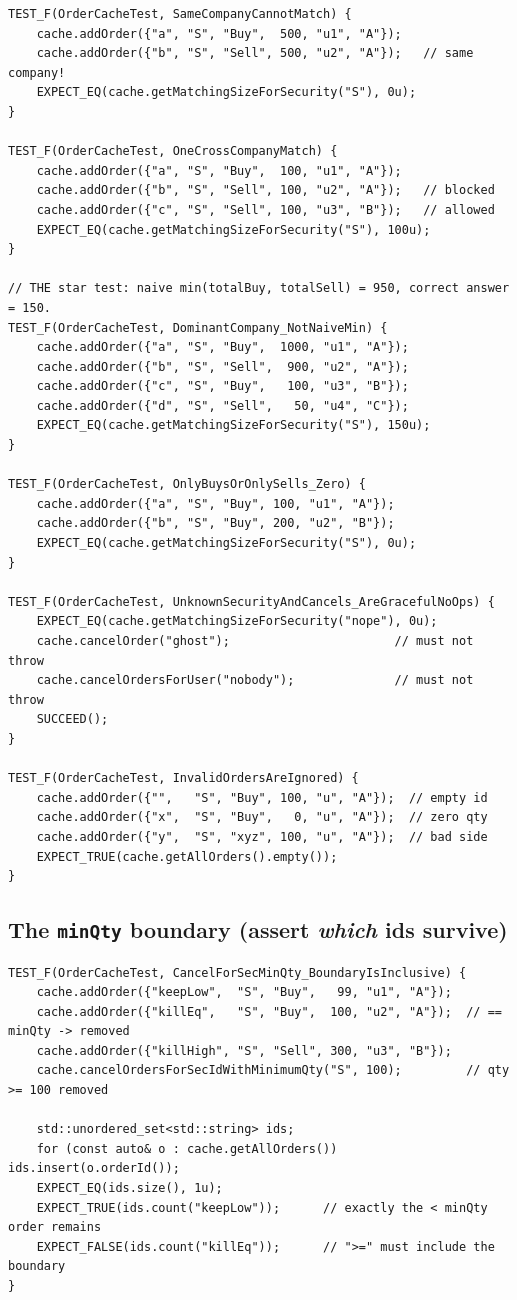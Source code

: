 \begin{lstlisting}
TEST_F(OrderCacheTest, SameCompanyCannotMatch) {
    cache.addOrder({"a", "S", "Buy",  500, "u1", "A"});
    cache.addOrder({"b", "S", "Sell", 500, "u2", "A"});   // same company!
    EXPECT_EQ(cache.getMatchingSizeForSecurity("S"), 0u);
}

TEST_F(OrderCacheTest, OneCrossCompanyMatch) {
    cache.addOrder({"a", "S", "Buy",  100, "u1", "A"});
    cache.addOrder({"b", "S", "Sell", 100, "u2", "A"});   // blocked
    cache.addOrder({"c", "S", "Sell", 100, "u3", "B"});   // allowed
    EXPECT_EQ(cache.getMatchingSizeForSecurity("S"), 100u);
}

// THE star test: naive min(totalBuy, totalSell) = 950, correct answer = 150.
TEST_F(OrderCacheTest, DominantCompany_NotNaiveMin) {
    cache.addOrder({"a", "S", "Buy",  1000, "u1", "A"});
    cache.addOrder({"b", "S", "Sell",  900, "u2", "A"});
    cache.addOrder({"c", "S", "Buy",   100, "u3", "B"});
    cache.addOrder({"d", "S", "Sell",   50, "u4", "C"});
    EXPECT_EQ(cache.getMatchingSizeForSecurity("S"), 150u);
}

TEST_F(OrderCacheTest, OnlyBuysOrOnlySells_Zero) {
    cache.addOrder({"a", "S", "Buy", 100, "u1", "A"});
    cache.addOrder({"b", "S", "Buy", 200, "u2", "B"});
    EXPECT_EQ(cache.getMatchingSizeForSecurity("S"), 0u);
}

TEST_F(OrderCacheTest, UnknownSecurityAndCancels_AreGracefulNoOps) {
    EXPECT_EQ(cache.getMatchingSizeForSecurity("nope"), 0u);
    cache.cancelOrder("ghost");                       // must not throw
    cache.cancelOrdersForUser("nobody");              // must not throw
    SUCCEED();
}

TEST_F(OrderCacheTest, InvalidOrdersAreIgnored) {
    cache.addOrder({"",   "S", "Buy", 100, "u", "A"});  // empty id
    cache.addOrder({"x",  "S", "Buy",   0, "u", "A"});  // zero qty
    cache.addOrder({"y",  "S", "xyz", 100, "u", "A"});  // bad side
    EXPECT_TRUE(cache.getAllOrders().empty());
}
\end{lstlisting}

\subsection{The \texttt{minQty} boundary (assert \emph{which} ids survive)}

\begin{lstlisting}
TEST_F(OrderCacheTest, CancelForSecMinQty_BoundaryIsInclusive) {
    cache.addOrder({"keepLow",  "S", "Buy",   99, "u1", "A"});
    cache.addOrder({"killEq",   "S", "Buy",  100, "u2", "A"});  // == minQty -> removed
    cache.addOrder({"killHigh", "S", "Sell", 300, "u3", "B"});
    cache.cancelOrdersForSecIdWithMinimumQty("S", 100);         // qty >= 100 removed

    std::unordered_set<std::string> ids;
    for (const auto& o : cache.getAllOrders()) ids.insert(o.orderId());
    EXPECT_EQ(ids.size(), 1u);
    EXPECT_TRUE(ids.count("keepLow"));      // exactly the < minQty order remains
    EXPECT_FALSE(ids.count("killEq"));      // ">=" must include the boundary
}
\end{lstlisting}


